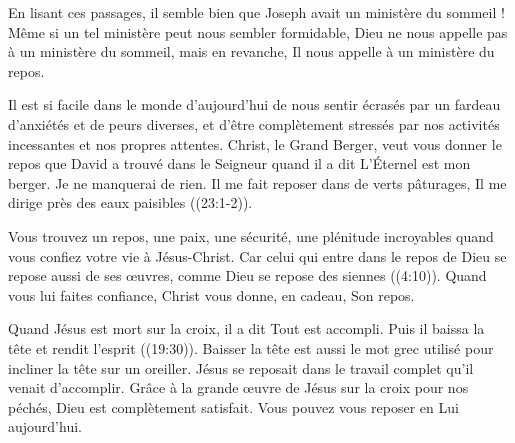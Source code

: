 En lisant ces passages, il semble bien que Joseph avait un \Og ministère du sommeil \Fg{}! Même si un tel ministère peut nous sembler formidable, Dieu ne nous appelle pas à un ministère du sommeil, mais en revanche, Il nous appelle à un ministère du repos.

Il est si facile dans le monde d'aujourd'hui de nous sentir écrasés par un fardeau d'anxiétés et de peurs diverses, et d'être complètement stressés par nos activités incessantes et nos propres attentes. Christ, le Grand Berger, veut vous donner le repos que David a trouvé dans le Seigneur quand il a dit\frcolon{} \Og L’Éternel est mon berger. Je ne manquerai de rien. Il me fait reposer dans de verts pâturages, Il me dirige près des eaux paisibles \Fg{} ((23:1-2)).

Vous trouvez un repos, une paix, une sécurité, une plénitude incroyables quand vous confiez votre vie à Jésus-Christ. \Og Car celui qui entre dans le repos de Dieu se repose aussi de ses \oe{}uvres, comme Dieu se repose des siennes \Fg{} ((4:10)). Quand vous lui faites confiance, Christ vous donne, en cadeau, Son repos.

Quand Jésus est mort sur la croix, il a dit\frcolon{} \Og Tout est accompli. Puis il baissa la tête et rendit l’esprit \Fg{} ((19:30)). \Og Baisser la tête \Fg{} est aussi le mot grec utilisé pour incliner la tête sur un oreiller. Jésus se reposait dans le travail complet qu'il venait d'accomplir. Grâce à la grande œuvre de Jésus sur la croix pour nos péchés, Dieu est complètement satisfait. Vous pouvez vous reposer en Lui aujourd'hui.

\begin{dvquotes}
\end{dvquotes}
